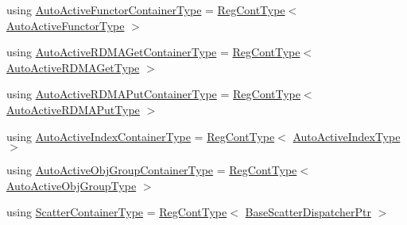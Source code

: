 \begin{DoxyCompactItemize}
\item 
using \hyperlink{namespacevt_1_1auto__registry_abe0cefefe73cf87e520a5ab3ebc88f4a}{Auto\+Active\+Functor\+Container\+Type} = \hyperlink{namespacevt_1_1auto__registry_a988a4943e4c8fe82b56f5b13bddceb2b}{Reg\+Cont\+Type}$<$ \hyperlink{namespacevt_1_1auto__registry_a092979b3ed6cf9e21e6a5823fdaa0c12}{Auto\+Active\+Functor\+Type} $>$
\item 
using \hyperlink{namespacevt_1_1auto__registry_a85bc3ac8c35caf2f304c24a73a07f1c6}{Auto\+Active\+R\+D\+M\+A\+Get\+Container\+Type} = \hyperlink{namespacevt_1_1auto__registry_a988a4943e4c8fe82b56f5b13bddceb2b}{Reg\+Cont\+Type}$<$ \hyperlink{namespacevt_1_1auto__registry_a039813f93a5804c77ae612e0318fb335}{Auto\+Active\+R\+D\+M\+A\+Get\+Type} $>$
\item 
using \hyperlink{namespacevt_1_1auto__registry_a7051002e8986239f9c5f986384ebec66}{Auto\+Active\+R\+D\+M\+A\+Put\+Container\+Type} = \hyperlink{namespacevt_1_1auto__registry_a988a4943e4c8fe82b56f5b13bddceb2b}{Reg\+Cont\+Type}$<$ \hyperlink{namespacevt_1_1auto__registry_a1f67d3efa37b61040b56258ca59df088}{Auto\+Active\+R\+D\+M\+A\+Put\+Type} $>$
\item 
using \hyperlink{namespacevt_1_1auto__registry_a892918ae7bc486701964f7e5e0bb0c8a}{Auto\+Active\+Index\+Container\+Type} = \hyperlink{namespacevt_1_1auto__registry_a988a4943e4c8fe82b56f5b13bddceb2b}{Reg\+Cont\+Type}$<$ \hyperlink{namespacevt_1_1auto__registry_ad5ff1c3344b954a1e1212c72c74e4a7a}{Auto\+Active\+Index\+Type} $>$
\item 
using \hyperlink{namespacevt_1_1auto__registry_a2328b4aa12baaa0b0fc0bf07ed2be755}{Auto\+Active\+Obj\+Group\+Container\+Type} = \hyperlink{namespacevt_1_1auto__registry_a988a4943e4c8fe82b56f5b13bddceb2b}{Reg\+Cont\+Type}$<$ \hyperlink{namespacevt_1_1auto__registry_a4b369568c19084c562ddbeef6894a145}{Auto\+Active\+Obj\+Group\+Type} $>$
\item 
using \hyperlink{namespacevt_1_1auto__registry_a0f315fdd34135b6a311be7225157bb6b}{Scatter\+Container\+Type} = \hyperlink{namespacevt_1_1auto__registry_a988a4943e4c8fe82b56f5b13bddceb2b}{Reg\+Cont\+Type}$<$ \hyperlink{namespacevt_1_1auto__registry_aba7be4c573c0f1361c024e4d3293a62a}{Base\+Scatter\+Dispatcher\+Ptr} $>$
\end{DoxyCompactItemize}
